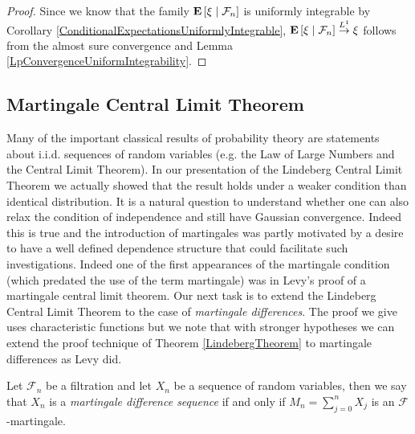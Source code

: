 \begin{proof}
Since we know that the family $\textbf{E}\left[ \xi \mid \mathcal{F}_n \right]$
is uniformly integrable by Corollary
\ref{ConditionalExpectationsUniformlyIntegrable},
$\textbf{E}\left[ \xi \mid \mathcal{F}_n \right] \overset{L^1}\to \xi$ follows from the
almost sure convergence and Lemma \ref{LpConvergenceUniformIntegrability}.
\end{proof}

\subsection{Martingale Central Limit Theorem}

Many of the important classical results of probability theory are
statements about i.i.d. sequences of random variables (e.g. the Law of
Large Numbers and the Central Limit Theorem).  In our presentation of
the Lindeberg Central Limit Theorem we actually showed that the result
holds under a weaker condition than identical distribution.  It is a
natural question to understand whether one can also relax the
condition of independence and still have Gaussian convergence.  Indeed
this is true and the introduction of martingales was partly motivated
by a desire to have a well defined dependence structure that could
facilitate such investigations.  Indeed one of the first appearances
of the martingale condition (which predated the use of the term
martingale) was in Levy's proof of a martingale central limit theorem.  Our next task is to extend the
Lindeberg Central Limit Theorem to the case of \emph{martingale
  differences}.  The proof we give uses characteristic functions but
we note that with stronger hypotheses we can extend the proof
technique of Theorem \ref{LindebergTheorem} to martingale differences
as Levy did.

\begin{defn}Let $\mathcal{F}_n$ be a filtration and let $X_n$ be a
  sequence of random variables, then we say that $X_n$ is a
  \emph{martingale difference sequence} if and only if $M_n =
  \sum_{j=0}^n X_j$ is an $\mathcal{F}$-martingale.
\end{defn}

